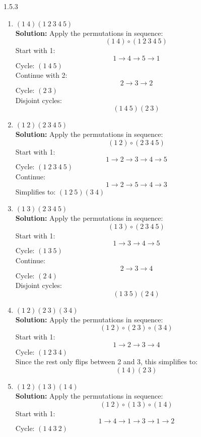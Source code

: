 \documentclass[12pt]{amsart}
\theoremstyle{definition}
\numberwithin{equation}{section}
\begin{document}
\begin{exercise}{1.5.3}
\begin{enumerate}[label=(\alph*)]
            \item \((1 \ 4)(1 \ 2 \ 3 \ 4 \ 5)\)\\
            \textbf{Solution:} Apply the permutations in sequence:
            \[ (1 \ 4) \circ (1 \ 2 \ 3 \ 4 \ 5) \]
            Start with 1:
            \[ 1 \to 4 \to 5 \to 1 \]
            Cycle: \( (1 \ 4 \ 5) \)\\
            Continue with 2:
            \[ 2 \to 3 \to 2 \]
            Cycle: \( (2 \ 3) \)\\
            Disjoint cycles: 
            \[
            (1 \ 4 \ 5)(2 \ 3)
            \]
        
            \item \((1 \ 2)(2 \ 3 \ 4 \ 5)\)\\
            \textbf{Solution:} Apply the permutations in sequence:
            \[ (1 \ 2) \circ (2 \ 3 \ 4 \ 5) \]
            Start with 1:
            \[ 1 \to 2 \to 3 \to 4 \to 5 \]
            Cycle: \( (1 \ 2 \ 3 \ 4 \ 5) \)\\
            Continue:
            \[ 1 \to 2 \to 5 \to 4 \to 3 \]
            Simplifies to: \( (1 \ 2 \ 5)(3 \ 4) \)
        
            \item \((1 \ 3)(2 \ 3 \ 4 \ 5)\)\\
            \textbf{Solution:} Apply the permutations in sequence:
            \[ (1 \ 3) \circ (2 \ 3 \ 4 \ 5) \]
            Start with 1:
            \[ 1 \to 3 \to 4 \to 5 \]
            Cycle: \( (1 \ 3 \ 5) \)\\
            Continue:
            \[ 2 \to 3 \to 4 \]
            Cycle: \( (2 \ 4) \)\\
            Disjoint cycles: 
            \[
            (1 \ 3 \ 5)(2 \ 4)
            \]
        
            \item \((1 \ 2)(2 \ 3)(3 \ 4)\)\\
            \textbf{Solution:} Apply the permutations in sequence:
            \[ (1 \ 2) \circ (2 \ 3) \circ (3 \ 4) \]
            Start with 1:
            \[ 1 \to 2 \to 3 \to 4 \]
            Cycle: \( (1 \ 2 \ 3 \ 4) \)\\
            Since the rest only flips between 2 and 3, this simplifies to:
            \[
            (1 \ 4)(2 \ 3)
            \]
        
            \item \((1 \ 2)(1 \ 3)(1 \ 4)\)\\
            \textbf{Solution:} Apply the permutations in sequence:
            \[ (1 \ 2) \circ (1 \ 3) \circ (1 \ 4) \]
            Start with 1:
            \[ 1 \to 4 \to 1 \to 3 \to 1 \to 2 \]
            Cycle: \( (1 \ 4 \ 3 \ 2) \)
        

\end{enumerate}
\end{exercise}
\end{document}
